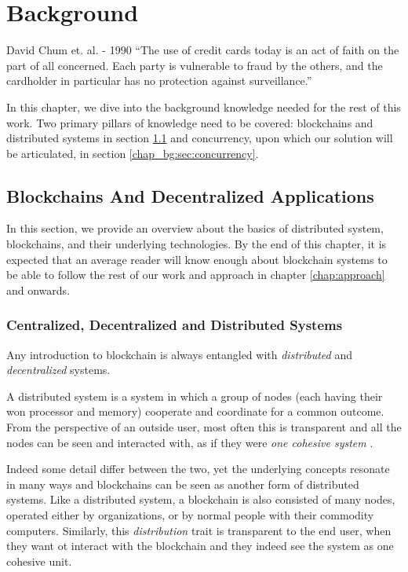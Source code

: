 \chapter{Background} \label{chap:background}

\begin{chapquote}{David Chum et. al. - 1990}
``The use of credit cards today is an act of faith on the part of all concerned. Each party is
vulnerable to fraud by the others, and the cardholder in particular has no protection against
surveillance.''
\end{chapquote}


In this chapter, we dive into the background knowledge needed for the rest of this work. Two primary
pillars of knowledge need to be covered: blockchains and distributed systems in section
\ref{chap_bg:sec:blockchains} and concurrency, upon which our solution will be articulated, in
section \ref{chap_bg:sec:concurrency}.

\section{Blockchains And Decentralized Applications} \label{chap_bg:sec:blockchains}

In this section, we provide an overview about the basics of distributed system, blockchains, and
their underlying technologies. By the end of this chapter, it is expected that an average reader
will know enough about blockchain systems to be able to follow the rest of our work and approach in
chapter \ref{chap:approach} and onwards.

\subsection{Centralized, Decentralized and Distributed Systems}

Any introduction to blockchain is always entangled with \textit{distributed} and
\textit{decentralized} systems.

A distributed system is a system in which a group of nodes (each having their won processor and
memory) cooperate and coordinate for a common outcome. From the perspective of an outside user, most
often this is transparent and all the nodes can be seen and interacted with, as if they were
\textit{one cohesive system} \cite{bashirMASTERINGBLOCKCHAINDistributed2018}.

Indeed some detail differ between the two, yet the underlying concepts resonate in many ways
\cite{herlihyBlockchainsDistributedComputing2019} and blockchains can be seen as another form of
distributed systems. Like a distributed system, a blockchain is also consisted of many nodes,
operated either by organizations, or by normal people with their commodity computers. Similarly,
this \textit{distribution} trait is transparent to the end user, when they want ot interact with the
blockchain and they indeed see the system as one cohesive unit.


